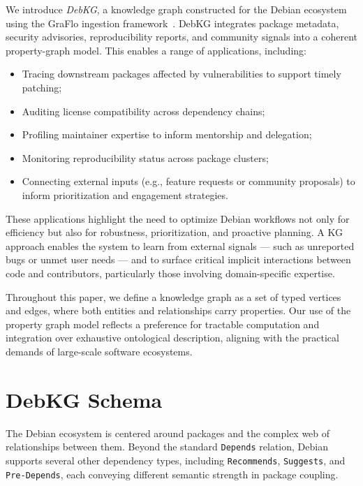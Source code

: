 \documentclass[10pt,oneside,a4paper, twocolumn]{article}
\begin{document}
    We introduce \emph{DebKG}, a knowledge graph constructed for the Debian ecosystem using the GraFlo ingestion framework~\cite{graflo}.
    DebKG integrates package metadata, security advisories, reproducibility reports, and community signals into a coherent property-graph model.
    This enables a range of applications, including:

    \begin{itemize}
        \item Tracing downstream packages affected by vulnerabilities to support timely patching;
        \item Auditing license compatibility across dependency chains;
        \item Profiling maintainer expertise to inform mentorship and delegation;
        \item Monitoring reproducibility status across package clusters;
        \item Connecting external inputs (e.g., feature requests or community proposals) to inform prioritization and engagement strategies.
    \end{itemize}

    These applications highlight the need to optimize Debian workflows not only for efficiency but also for robustness, prioritization, and proactive planning.
    A KG approach enables the system to learn from external signals — such as unreported bugs or unmet user needs — and to surface critical implicit interactions between code and contributors, particularly those involving domain-specific expertise.

    Throughout this paper, we define a knowledge graph as a set of typed vertices and edges, where both entities and relationships carry properties.
    Our use of the property graph model reflects a preference for tractable computation and integration over exhaustive ontological description, aligning with the practical demands of large-scale software ecosystems.


    \section{DebKG Schema}

    The Debian ecosystem is centered around packages and the complex web of relationships between them.
    Beyond the standard \texttt{Depends} relation, Debian supports several other dependency types, including \texttt{Recommends}, \texttt{Suggests}, and \texttt{Pre-Depends}, each conveying different semantic strength in package coupling.
\end{document}
